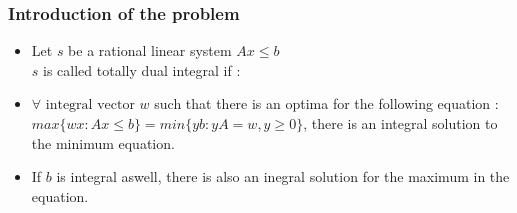 \documentclass{beamer}
\begin{document}
\begin{frame}
	\frametitle{Introduction of the problem}
	\begin{itemize}
		\item Let $s$ be a rational linear system $Ax \leqslant b$\\
		$s$ is called totally dual integral if :
 
		\item $\forall \text{ integral vector }w$ such that there is an optima for the following equation : $max\{wx:Ax\leqslant b\}=min\{yb:yA=w,y\geqslant 0\}$, there is an integral solution to the minimum equation. 
		\item If $b$ is integral aswell, there is also an inegral solution for the maximum in the equation.
	\end{itemize}

\end{frame}
\end{document}

